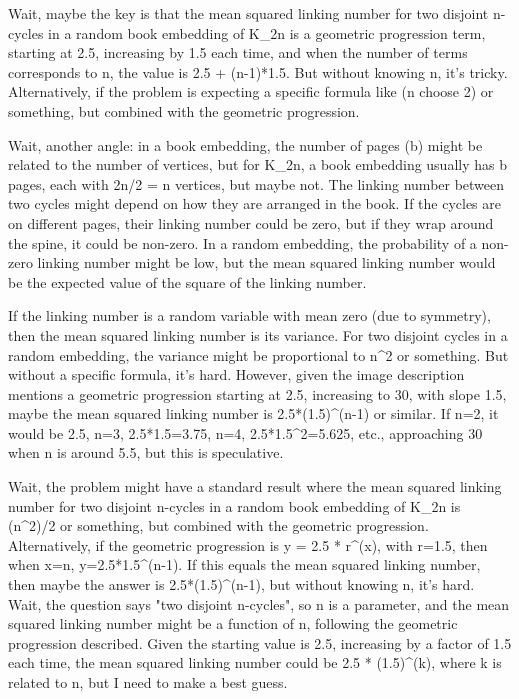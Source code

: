 Wait, maybe the key is that the mean squared linking number for two disjoint n-cycles in a random book embedding of K_{2n} is a geometric progression term, starting at 2.5, increasing by 1.5 each time, and when the number of terms corresponds to n, the value is 2.5 + (n-1)*1.5. But without knowing n, it's tricky. Alternatively, if the problem is expecting a specific formula like (n choose 2) or something, but combined with the geometric progression.

Wait, another angle: in a book embedding, the number of pages (b) might be related to the number of vertices, but for K_{2n}, a book embedding usually has b pages, each with 2n/2 = n vertices, but maybe not. The linking number between two cycles might depend on how they are arranged in the book. If the cycles are on different pages, their linking number could be zero, but if they wrap around the spine, it could be non-zero. In a random embedding, the probability of a non-zero linking number might be low, but the mean squared linking number would be the expected value of the square of the linking number.

If the linking number is a random variable with mean zero (due to symmetry), then the mean squared linking number is its variance. For two disjoint cycles in a random embedding, the variance might be proportional to n^2 or something. But without a specific formula, it's hard. However, given the image description mentions a geometric progression starting at 2.5, increasing to 30, with slope 1.5, maybe the mean squared linking number is 2.5*(1.5)^(n-1) or similar. If n=2, it would be 2.5, n=3, 2.5*1.5=3.75, n=4, 2.5*1.5^2=5.625, etc., approaching 30 when n is around 5.5, but this is speculative.

Wait, the problem might have a standard result where the mean squared linking number for two disjoint n-cycles in a random book embedding of K_{2n} is (n^2)/2 or something, but combined with the geometric progression. Alternatively, if the geometric progression is y = 2.5 * r^(x), with r=1.5, then when x=n, y=2.5*1.5^(n-1). If this equals the mean squared linking number, then maybe the answer is 2.5*(1.5)^(n-1), but without knowing n, it's hard. Wait, the question says "two disjoint n-cycles", so n is a parameter, and the mean squared linking number might be a function of n, following the geometric progression described. Given the starting value is 2.5, increasing by a factor of 1.5 each time, the mean squared linking number could be 2.5 * (1.5)^(k), where k is related to n, but I need to make a best guess.

